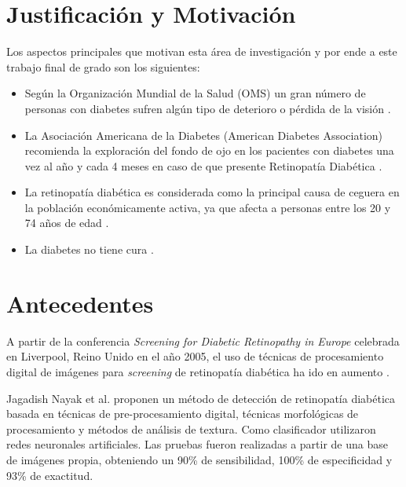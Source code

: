 \section{Justificación y Motivación}
Los aspectos principales que motivan esta área de investigación y por ende a este trabajo final de grado son los siguientes:
\begin{itemize}


\item Según la Organización Mundial de la Salud (OMS) un gran número de  personas con diabetes sufren algún tipo de deterioro o pérdida de la visión  \cite{oms}. 

\item La  Asociación  Americana  de  la  Diabetes  (American  Diabetes  Association)  recomienda  la exploración del fondo de ojo en los pacientes con  diabetes una vez al año y cada 4 meses en caso de que presente Retinopatía Diabética \cite{cigna}.

\item La retinopatía diabética es considerada como la principal causa de ceguera en la población económicamente activa,  ya  que  afecta  a  personas  entre  los 20  y  74  años  de  edad \cite{fong2004retinopathy,browning2010diabetic}.

\item La diabetes no tiene cura \cite{kindberg1999supporting,kleinfield2006diabetes}.
\end{itemize}

\section{Antecedentes}

A partir de la  conferencia \textit{Screening for Diabetic Retinopathy in Europe} celebrada en Liverpool, Reino Unido en el año 2005, el uso de técnicas de procesamiento digital de imágenes para \textit{screening} de retinopatía diabética ha ido en aumento \cite{iqbal2006automatic}.

Jagadish Nayak et al. \cite{nayak2008automated} proponen un método de detección de retinopatía diabética basada en técnicas de pre-procesamiento digital, técnicas morfológicas de procesamiento y métodos de análisis de textura. Como clasificador utilizaron redes neuronales artificiales. Las pruebas fueron realizadas a partir de una base de imágenes propia, obteniendo un 90\% de sensibilidad, 100\% de especificidad y 93\% de exactitud.



